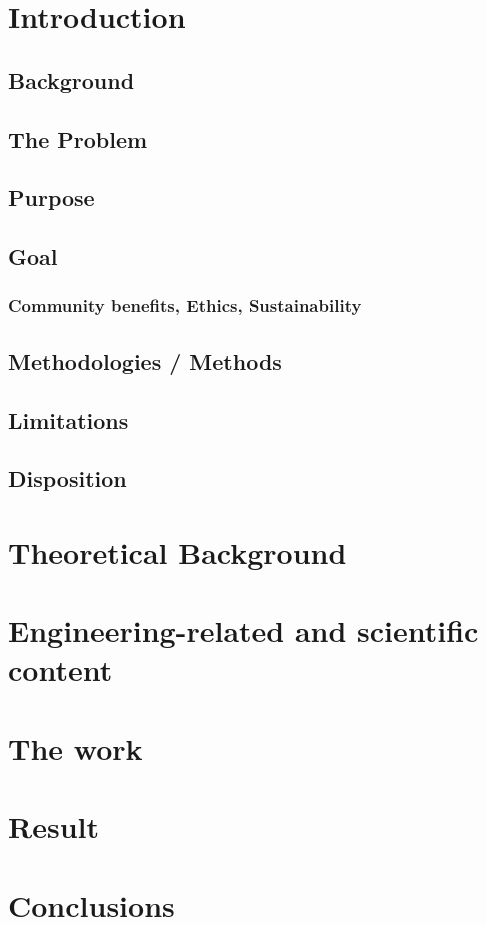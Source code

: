 \documentclass[11pt, a4paper, onecolumn]{article}
\begin{document}
	\tableofcontents
	\newpage
	
	\section{Introduction}
	
		\subsection{Background}
		
		\subsection{The Problem}
		
		\subsection{Purpose}
		
		\subsection{Goal}
		
			\subsubsection{Community benefits, Ethics, Sustainability}
			
		\subsection{Methodologies / Methods}
		
		\subsection{Limitations}
		
		\subsection{Disposition}
		
	\newpage
		
	\section{Theoretical Background}
	\newpage
	
	\section{Engineering-related and scientific content}
	\newpage
	
	\section{The work}
	\newpage
	
	\section{Result}
	\newpage
	
	\section{Conclusions}
	\newpage
		
\end{document}

